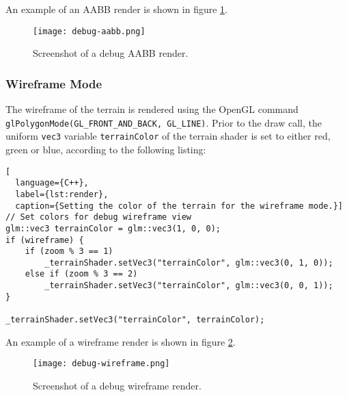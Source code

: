 An example of an AABB render is shown in figure \ref{fig:debug-aabb}.

\begin{figure}[H]
  \centering
  \texttt{[image: debug-aabb.png]}
  \caption{Screenshot of a debug AABB render.}\label{fig:debug-aabb}
\end{figure}

\subsubsection{Wireframe Mode}
The wireframe of the terrain is rendered using the OpenGL command \texttt{glPolygonMode(GL\_FRONT\_AND\_BACK, GL\_LINE)}.
Prior to the draw call, the uniform \texttt{vec3} variable \texttt{terrainColor} of the terrain shader is set to either red,
green or blue, according to the following listing:

\begin{lstlisting}[
  language={C++},
  label={lst:render},
  caption={Setting the color of the terrain for the wireframe mode.}]
// Set colors for debug wireframe view
glm::vec3 terrainColor = glm::vec3(1, 0, 0);
if (wireframe) {
    if (zoom % 3 == 1)
        _terrainShader.setVec3("terrainColor", glm::vec3(0, 1, 0));
    else if (zoom % 3 == 2)
        _terrainShader.setVec3("terrainColor", glm::vec3(0, 0, 1));
}

_terrainShader.setVec3("terrainColor", terrainColor);
\end{lstlisting}

An example of a wireframe render is shown in figure \ref{fig:debug-wireframe}.

\begin{figure}[H]
  \centering
  \texttt{[image: debug-wireframe.png]}
  \caption{Screenshot of a debug wireframe render.}\label{fig:debug-wireframe}
\end{figure}
